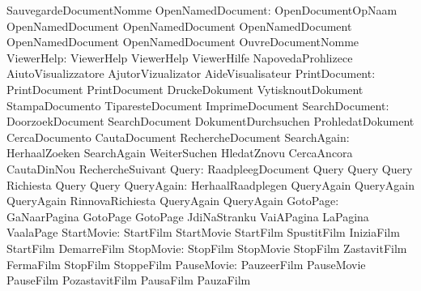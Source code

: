                            SauvegardeDocumentNomme
        OpenNamedDocument: OpenDocumentOpNaam        OpenNamedDocument
                           OpenNamedDocument         OpenNamedDocument
                           OpenNamedDocument         OpenNamedDocument
                           OuvreDocumentNomme
               ViewerHelp: ViewerHelp                ViewerHelp
                           ViewerHilfe               NapovedaProhlizece
                           AiutoVisualizzatore       AjutorVizualizator
                           AideVisualisateur
            PrintDocument: PrintDocument             PrintDocument
                           DruckeDokument            VytisknoutDokument
                           StampaDocumento           TiparesteDocument
                           ImprimeDocument
           SearchDocument: DoorzoekDocument          SearchDocument
                           DokumentDurchsuchen       ProhledatDokument
                           CercaDocumento            CautaDocument
                           RechercheDocument
              SearchAgain: HerhaalZoeken             SearchAgain
                           WeiterSuchen              HledatZnovu
                           CercaAncora               CautaDinNou
                           RechercheSuivant
                    Query: RaadpleegDocument         Query
                           Query                     Query
                           Richiesta                 Query
                           Query
               QueryAgain: HerhaalRaadplegen         QueryAgain
                           QueryAgain                QueryAgain
                           RinnovaRichiesta          QueryAgain
                           QueryAgain
                 GotoPage: GaNaarPagina              GotoPage
                           GotoPage                  JdiNaStranku
                           VaiAPagina                LaPagina
                           VaalaPage
               StartMovie: StartFilm                 StartMovie
                           StartFilm                 SpustitFilm
                           IniziaFilm                StartFilm
                           DemarreFilm
                StopMovie: StopFilm                  StopMovie
                           StopFilm                  ZastavitFilm
                           FermaFilm                 StopFilm
                           StoppeFilm
               PauseMovie: PauzeerFilm               PauseMovie
                           PauseFilm                 PozastavitFilm
                           PausaFilm                 PauzaFilm
